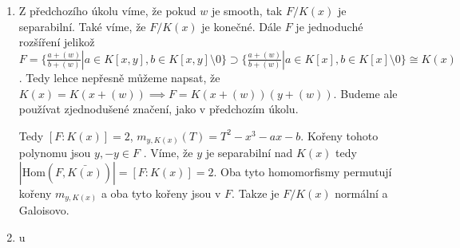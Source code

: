 \documentclass[12pt, a4paper]{article}
\begin{document}
\section{}
\begin{enumerate}[label=(\alph*)]
    \item Z předchozího úkolu víme, že pokud $w$ je smooth, tak $F/K(x)$ je separabilní. Také víme, že $F/K(x)$ je konečné. Dále $F$ je jednoduché rozšíření jelikož $F = \{\frac{a+(w)}{b+(w)}| a \in K[x,y], b \in K[x,y] \setminus 0 \} \supset \{\frac{a+(w)}{b+(w)}| a \in K[x], b \in K[x] \setminus 0 \} \cong K(x)$. Tedy lehce nepřesně můžeme napsat, že $K(x)=K(x+(w)) \implies F = K(x+(w))(y+(w))$. Budeme ale používat zjednodušené značení, jako v předchozím úkolu. 

    Tedy $[F:K(x)]=2$, $m_{y,K(x)}(T)=T^2 - x^3 - ax -b$. Kořeny tohoto polynomu jsou $y,-y \in F$ . Víme, že $y$ je separabilní nad $K(x)$ tedy  $|\text{Hom}(F,\bar{K(x)})|=[F:K(x)]=2$. Oba tyto homomorfismy permutují kořeny $m_{y,K(x)}$ a oba tyto kořeny jsou v $F$. Takze je $F/K(x)$ normální a Galoisovo.
    \item u
\end{enumerate}
\end{document}
